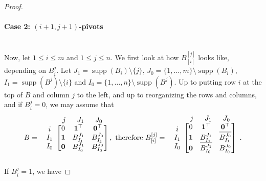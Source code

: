 \documentclass[10pt,a4paper]{amsart}
\renewcommand*{\leq}{\leqslant}
\DeclareMathOperator{\supp}{supp}
\begin{document}
\begin{proof}
\paragraph*{\textbf{Case 2: $(i+1,j+1)$-pivots}}~\\
Now, let $1\leq i\leq m$ and $1\leq j\leq n$. We first look at how $B_{[i]}^{[j]}$ looks like, depending on $B_i^j$.
\renewcommand{\arraystretch}{1.5}
Let $J_1=\supp(B_i)\setminus \{j\}$, $J_0 =\{1,\ldots,m\}\setminus \supp(B_i)$, $I_1=\supp(B^j)\setminus\{i\}$ and $I_0 =\{1,\ldots,n\}\setminus \supp(B^j)$.
Up to putting row $i$ at the top of $B$ and column $j$ to the left, and up to reorganizing the rows and columns, and if $B_i^j=0$, we may assume that
$$B=\begin{array}{c@{}c}
& \begin{array}{lcc}
	j\;\; & J_1\;\;& J_0
\end{array}\\
\begin{array}{c}
	i\\I_1 \\ I_0
\end{array} &\begin{bmatrix}
	0 &\mathbf{1}^\top & \mathbf{0}^\top\\
	\mathbf{1} & B_{I_1}^{J_1} & B_{I_1}^{J_0} \\
	\mathbf{0} & B_{I_0}^{J_1} & B_{I_0}^{J_0} \\
\end{bmatrix}\\&\end{array}\!\!, \text{ therefore } B_{[i]}^{[j]}=\begin{array}{c@{}c}
& \begin{array}{lcc}
	j\;\; & J_1\;\; & J_0
\end{array}\\
\begin{array}{c}
	i\\I_1 \\ I_0
\end{array} &\begin{bmatrix}
	0 &\mathbf{1}^\top & \mathbf{0}^\top\\
	\mathbf{1} & B_{I_1}^{J_1} & \overline{B_{I_1}^{J_0}} \\
	\mathbf{0} & \overline{B_{I_0}^{J_1}} & B_{I_0}^{J_0} \\
\end{bmatrix}\\&\end{array}.$$
If $B_i^j=1$, we have 

\end{proof}
\end{document}
